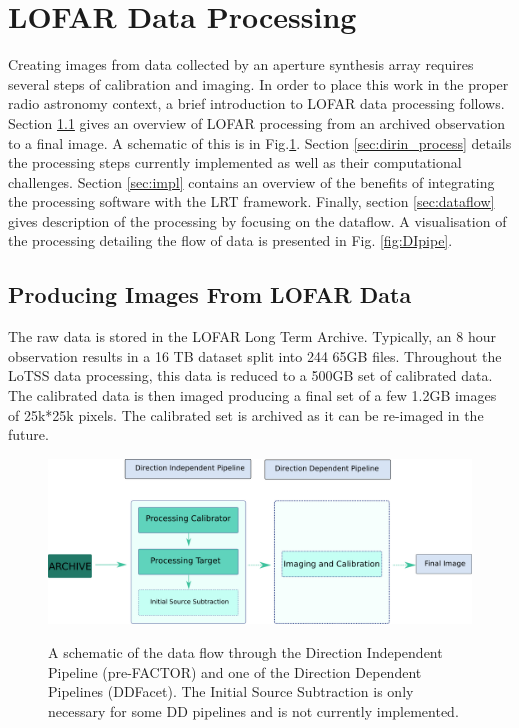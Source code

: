 \section{LOFAR Data Processing}\label{sec:lofar_red}

Creating images from data collected by an aperture synthesis array\cite{aperturesynth} requires several steps of calibration and imaging. In order to place this work in the proper radio astronomy context, a brief introduction to LOFAR data processing follows. Section \ref{sec:image} gives an overview of LOFAR processing from an archived observation to a final image. A schematic of this is in Fig.\ref{fig:both_pipes}. Section \ref{sec:dirin_process} details the processing steps currently implemented as well as their computational challenges. Section \ref{sec:impl} contains an overview of the benefits of integrating the processing software with the LRT framework.  Finally, section \ref{sec:dataflow} gives description of the processing by focusing on the dataflow. A visualisation of the processing detailing the flow of data is presented in Fig. \ref{fig:DIpipe}.


\subsection{Producing Images From LOFAR Data}\label{sec:image}

The raw data is stored in the LOFAR Long Term Archive. Typically, an 8 hour observation results in a 16 TB dataset split into 244 65GB files. Throughout the LoTSS data processing, this data is reduced to a 500GB set of calibrated data. The calibrated data is then imaged producing a final set of a few 1.2GB images of 25k*25k pixels. The calibrated set is archived as it can be re-imaged in the future. 

\begin{figure}
 \includegraphics[width=.79\textwidth]{ch3/figures/DIDDpipe.png}\\
 \caption{A schematic of the data flow through the Direction Independent Pipeline (pre-FACTOR\cite{prefactor}) and one of the Direction Dependent Pipelines (DDFacet). The Initial Source Subtraction is only necessary for some DD pipelines and is not currently implemented. }
 \label{fig:both_pipes}
\end{figure}


